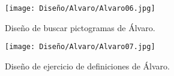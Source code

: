 \begin{figure}[ht!]
  \centering
  \texttt{[image: Diseño/Alvaro/Alvaro06.jpg]}
  \caption{Diseño de buscar pictogramas de Álvaro.}
  \label{fig:disenyoAlvaro05}
\end{figure}

\begin{figure}[ht!]
  \centering
  \texttt{[image: Diseño/Alvaro/Alvaro07.jpg]}
  \caption{Diseño de ejercicio de definiciones de Álvaro.}
  \label{fig:disenyoAlvaro06}
\end{figure}